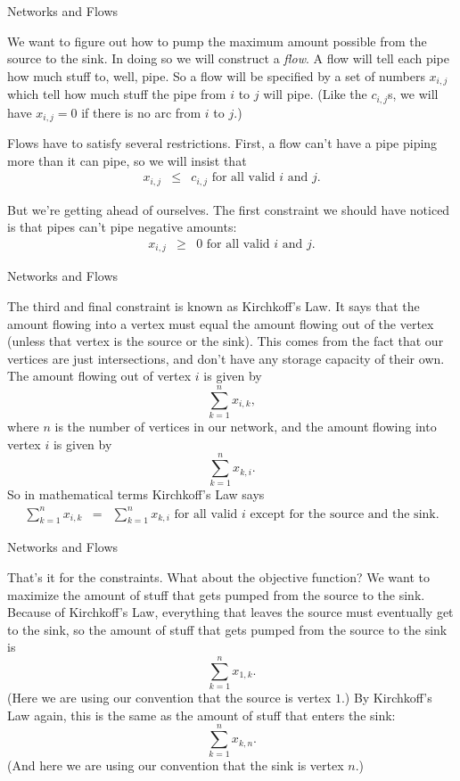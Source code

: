 \begin{frame}[fragile]{Networks and Flows}


We want to figure out how to pump the maximum amount possible from the source to the sink.  In doing so we will construct a {\it flow\/}.  A flow will tell each pipe how much stuff to, well, pipe.  So a flow will be specified by a set of numbers $x_{i,j}$ which tell how much stuff the pipe from $i$ to $j$ will pipe.  (Like the $c_{i,j}$s, we will have $x_{i,j}=0$ if there is no arc from $i$ to $j$.)

Flows have to satisfy several restrictions.  First, a flow can't have a pipe piping more than it can pipe, so we will insist that
\begin{eqnarray}\label{flow1}
x_{i,j}&\le&c_{i,j}\mbox{ for all valid $i$ and $j$.}
\end{eqnarray}

But we're getting ahead of ourselves.  The first constraint we should have noticed is that pipes can't pipe negative amounts:
\begin{eqnarray}\label{flow2}
x_{i,j}&\ge&0\mbox{ for all valid $i$ and $j$.}
\end{eqnarray}

\end{frame}
\begin{frame}[fragile]{Networks and Flows}


The third and final constraint is known as Kirchkoff's Law.  It says that the amount flowing into a vertex must equal the amount flowing out of the vertex (unless that vertex is the source or the sink).  This comes from the fact that our vertices are just intersections, and don't have any storage capacity of their own.  The amount flowing out of vertex $i$ is given by
$$
\sum_{k=1}^n x_{i,k},
$$
where $n$ is the number of vertices in our network, and the amount flowing into vertex $i$ is given by
$$
\sum_{k=1}^n x_{k,i}.
$$
So in mathematical terms Kirchkoff's Law says
\begin{eqnarray}\label{flow3}
\sum_{k=1}^n x_{i,k}&=&\sum_{k=1}^n x_{k,i}\mbox{ for all valid $i$ except for the source and the sink.}
\end{eqnarray}

\end{frame}
\begin{frame}[fragile]{Networks and Flows}


That's it for the constraints.  What about the objective function?  We want to maximize the amount of stuff that gets pumped from the source to the sink.  Because of Kirchkoff's Law, everything that leaves the source must eventually get to the sink, so the amount of stuff that gets pumped from the source to the sink is
$$
\sum_{k=1}^n x_{1,k}.
$$
(Here we are using our convention that the source is vertex $1$.)  By Kirchkoff's Law again, this is the same as the amount of stuff that enters the sink:
$$
\sum_{k=1}^n x_{k,n}.
$$
(And here we are using our convention that the sink is vertex $n$.)

\end{frame}
